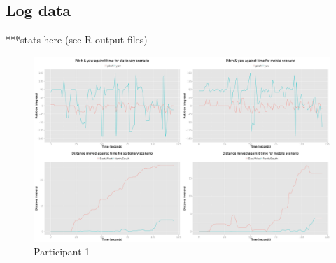 \documentclass[oneside]{book}
\begin{document}
\subsection{Log data}



	

		

***stats here (see R output files)


\begin{landscape}
	\begin{figure}[h]
		\begin{center}
			\includegraphics[width=\linewidth]{images/24072014_1200_4up.png}
			\caption{Participant 1}
			\label{participant_1_4up}
		\end{center}
	\end{figure}
\end{landscape}
\end{document}
